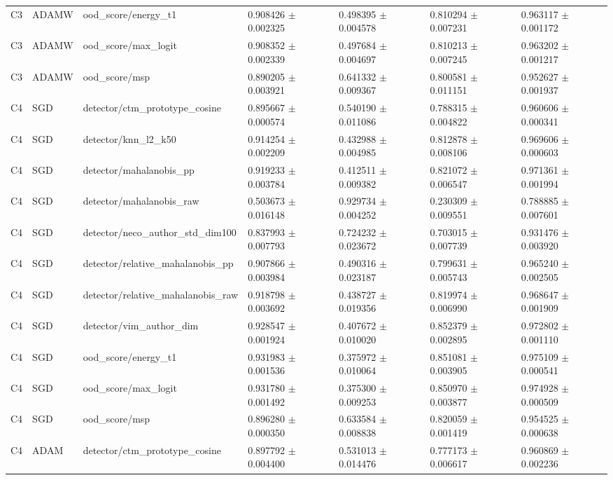 \begin{longtable}{lllllll}
C3 & ADAMW & ood\_score/energy\_t1 & 0.908426 $\pm$ 0.002325 & 0.498395 $\pm$ 0.004578 & 0.810294 $\pm$ 0.007231 & 0.963117 $\pm$ 0.001172 \\
C3 & ADAMW & ood\_score/max\_logit & 0.908352 $\pm$ 0.002339 & 0.497684 $\pm$ 0.004697 & 0.810213 $\pm$ 0.007245 & 0.963202 $\pm$ 0.001217 \\
C3 & ADAMW & ood\_score/msp & 0.890205 $\pm$ 0.003921 & 0.641332 $\pm$ 0.009367 & 0.800581 $\pm$ 0.011151 & 0.952627 $\pm$ 0.001937 \\
C4 & SGD & detector/ctm\_prototype\_cosine & 0.895667 $\pm$ 0.000574 & 0.540190 $\pm$ 0.011086 & 0.788315 $\pm$ 0.004822 & 0.960606 $\pm$ 0.000341 \\
C4 & SGD & detector/knn\_l2\_k50 & 0.914254 $\pm$ 0.002209 & 0.432988 $\pm$ 0.004985 & 0.812878 $\pm$ 0.008106 & 0.969606 $\pm$ 0.000603 \\
C4 & SGD & detector/mahalanobis\_pp & 0.919233 $\pm$ 0.003784 & 0.412511 $\pm$ 0.009382 & 0.821072 $\pm$ 0.006547 & 0.971361 $\pm$ 0.001994 \\
C4 & SGD & detector/mahalanobis\_raw & 0.503673 $\pm$ 0.016148 & 0.929734 $\pm$ 0.004252 & 0.230309 $\pm$ 0.009551 & 0.788885 $\pm$ 0.007601 \\
C4 & SGD & detector/neco\_author\_std\_dim100 & 0.837993 $\pm$ 0.007793 & 0.724232 $\pm$ 0.023672 & 0.703015 $\pm$ 0.007739 & 0.931476 $\pm$ 0.003920 \\
C4 & SGD & detector/relative\_mahalanobis\_pp & 0.907866 $\pm$ 0.003984 & 0.490316 $\pm$ 0.023187 & 0.799631 $\pm$ 0.005743 & 0.965240 $\pm$ 0.002505 \\
C4 & SGD & detector/relative\_mahalanobis\_raw & 0.918798 $\pm$ 0.003692 & 0.438727 $\pm$ 0.019356 & 0.819974 $\pm$ 0.006990 & 0.968647 $\pm$ 0.001909 \\
C4 & SGD & detector/vim\_author\_dim & 0.928547 $\pm$ 0.001924 & 0.407672 $\pm$ 0.010020 & 0.852379 $\pm$ 0.002895 & 0.972802 $\pm$ 0.001110 \\
C4 & SGD & ood\_score/energy\_t1 & 0.931983 $\pm$ 0.001536 & 0.375972 $\pm$ 0.010064 & 0.851081 $\pm$ 0.003905 & 0.975109 $\pm$ 0.000541 \\
C4 & SGD & ood\_score/max\_logit & 0.931780 $\pm$ 0.001492 & 0.375300 $\pm$ 0.009253 & 0.850970 $\pm$ 0.003877 & 0.974928 $\pm$ 0.000509 \\
C4 & SGD & ood\_score/msp & 0.896280 $\pm$ 0.000350 & 0.633584 $\pm$ 0.008838 & 0.820059 $\pm$ 0.001419 & 0.954525 $\pm$ 0.000638 \\
C4 & ADAM & detector/ctm\_prototype\_cosine & 0.897792 $\pm$ 0.004400 & 0.531013 $\pm$ 0.014476 & 0.777173 $\pm$ 0.006617 & 0.960869 $\pm$ 0.002236 \\

\end{longtable}
